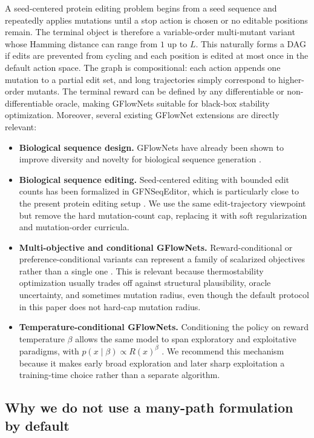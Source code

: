 \documentclass[11pt]{article}
\begin{document}
A seed-centered protein editing problem begins from a seed sequence and repeatedly applies mutations until a stop action is chosen or no editable positions remain. The terminal object is therefore a variable-order multi-mutant variant whose Hamming distance can range from $1$ up to $L$. This naturally forms a DAG if edits are prevented from cycling and each position is edited at most once in the default action space. The graph is compositional: each action appends one mutation to a partial edit set, and long trajectories simply correspond to higher-order mutants. The terminal reward can be defined by any differentiable or non-differentiable oracle, making GFlowNets suitable for black-box stability optimization. Moreover, several existing GFlowNet extensions are directly relevant:
\begin{itemize}[leftmargin=1.5em]
    \item \textbf{Biological sequence design.} GFlowNets have already been shown to improve diversity and novelty for biological sequence generation \citep{jain2022bioseqgfn}.
    \item \textbf{Biological sequence editing.} Seed-centered editing with bounded edit counts has been formalized in GFNSeqEditor, which is particularly close to the present protein editing setup \citep{ghari2024gfnseqeditor}. We use the same edit-trajectory viewpoint but remove the hard mutation-count cap, replacing it with soft regularization and mutation-order curricula.
    \item \textbf{Multi-objective and conditional GFlowNets.} Reward-conditional or preference-conditional variants can represent a family of scalarized objectives rather than a single one \citep{jain2023mogfn,zhu2023hn-gfn}. This is relevant because thermostability optimization usually trades off against structural plausibility, oracle uncertainty, and sometimes mutation radius, even though the default protocol in this paper does not hard-cap mutation radius.
    \item \textbf{Temperature-conditional GFlowNets.} Conditioning the policy on reward temperature $\beta$ allows the same model to span exploratory and exploitative paradigms, with $p(x\mid\beta)\propto R(x)^\beta$ \citep{kim2023lsl-gfn}. We recommend this mechanism because it makes early broad exploration and later sharp exploitation a training-time choice rather than a separate algorithm.
\end{itemize}

\subsection{Why we do not use a many-path formulation by default}
\end{document}
